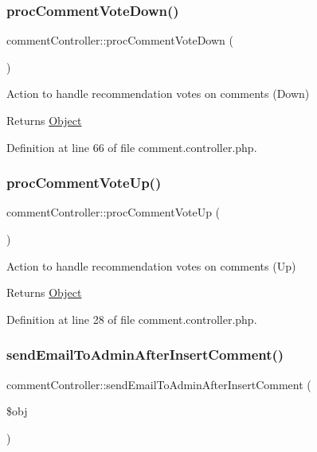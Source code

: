 \subsubsection{\texorpdfstring{proc\+Comment\+Vote\+Down()}{procCommentVoteDown()}}
{\footnotesize\ttfamily comment\+Controller\+::proc\+Comment\+Vote\+Down (\begin{DoxyParamCaption}{ }\end{DoxyParamCaption})}

Action to handle recommendation votes on comments (Down) \begin{DoxyReturn}{Returns}
\hyperlink{classObject}{Object} 
\end{DoxyReturn}


Definition at line 66 of file comment.\+controller.\+php.

\hypertarget{classcommentController_a1ca216be683b8cedf6b5f71aaa23a0b3}{}\label{classcommentController_a1ca216be683b8cedf6b5f71aaa23a0b3} 
\subsubsection{\texorpdfstring{proc\+Comment\+Vote\+Up()}{procCommentVoteUp()}}
{\footnotesize\ttfamily comment\+Controller\+::proc\+Comment\+Vote\+Up (\begin{DoxyParamCaption}{ }\end{DoxyParamCaption})}

Action to handle recommendation votes on comments (Up) \begin{DoxyReturn}{Returns}
\hyperlink{classObject}{Object} 
\end{DoxyReturn}


Definition at line 28 of file comment.\+controller.\+php.

\hypertarget{classcommentController_a36736562b092a021301ec11a61310e68}{}\label{classcommentController_a36736562b092a021301ec11a61310e68} 
\subsubsection{\texorpdfstring{send\+Email\+To\+Admin\+After\+Insert\+Comment()}{sendEmailToAdminAfterInsertComment()}}
{\footnotesize\ttfamily comment\+Controller\+::send\+Email\+To\+Admin\+After\+Insert\+Comment (\begin{DoxyParamCaption}\item[{}]{\$obj }\end{DoxyParamCaption})}

